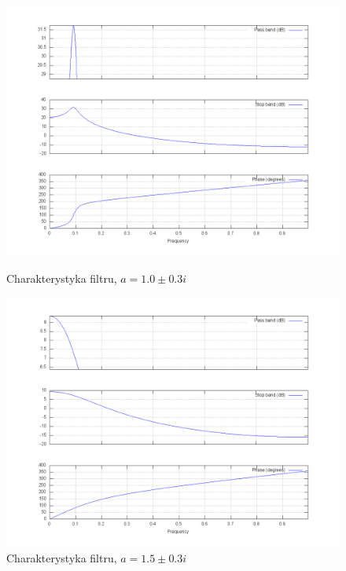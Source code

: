\documentclass[wide,a4paper,titlepage,12pt]{mwart}
\begin{document}
  \begin{figure}[htbp]
    \begin{center}
      \includegraphics[scale=.3]{out/fig35.png}
      \caption{\label{fig35} Charakterystyka filtru, $a=1.0\pm0.3i$}
      \includegraphics[scale=.3]{out/fig36.png}
      \caption{\label{fig36} Charakterystyka filtru, $a=1.5\pm0.3i$}

    \end{center}
  \end{figure}
\end{document}
